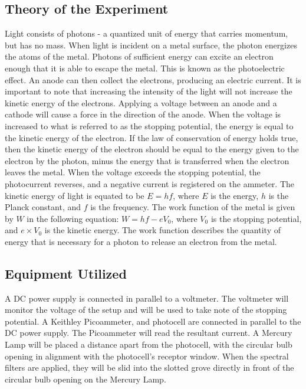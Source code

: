 \documentclass[a4paper]{article}
\begin{document}
\subsection{Theory of the Experiment}
\qq Light consists of photons - a quantized unit of energy that carries momentum, but has no mass. When
light is incident on a metal surface, the photon energizes the atoms of
the metal. Photons of sufficient energy can excite an electron enough that it is able to escape the metal. This
is known as the photoelectric effect. An anode can then collect the
electrons, producing an electric current. It is important to
note that increasing the intensity of the light will not increase the
kinetic energy of the electrons. Applying a voltage between an anode
and a cathode will cause a force in the direction of the anode. When the voltage
is increased to what is referred to as the stopping potential, the energy is equal to the kinetic energy of the electron. If the law of
conservation of energy holds true, then the kinetic energy of the
electron should be equal to the energy given to the electron by the
photon, minus the energy that is transferred when the electron leaves
the metal. When the voltage exceeds the stopping potential,
the photocurrent reverses, and a negative current is registered on the
ammeter. The kinetic energy of light is equated to be $E = hf$, where
$E$ is the energy, $h$ is the Planck constant, and $f$ is the
frequency. The work function of the metal is given by $W$ in the
following equation: $ W = h f - e V_0$, where $V_0$ is the
stopping potential, and $e \times V_0$ is the kinetic energy. The work
function describes the quantity of energy that is necessary for a
photon to release an electron from the metal.

\subsection{Equipment Utilized}

\qq A DC power supply is connected in parallel to a voltmeter. The
voltmeter will monitor the voltage of the setup and will be used to
take note of the stopping potential. A Keithley Picoammeter, and
photocell are connected in parallel to the DC power supply. The
Picoammeter will read the resultant current. A Mercury Lamp will be
placed a distance apart from the photocell, with the circular bulb
opening in alignment with the photocell's receptor window. When the
spectral filters are applied, they will be slid into the slotted grove
directly in front of the circular bulb opening on the Mercury Lamp. \\
\end{document}

